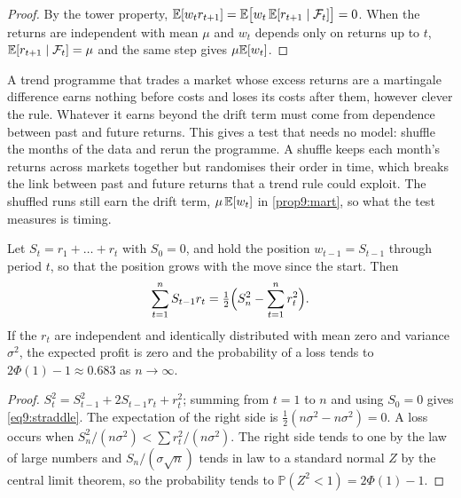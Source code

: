 \begin{chapterrefs}
\begin{proof}
By the tower property, $\mathbb{E}[w_tr_{t+1}]=\mathbb{E}\bigl[w_t\,\mathbb{E}[r_{t+1}\mid\mathcal F_t]\bigr]=0$. When the returns
are independent with mean $\mu$ and $w_t$ depends only on returns up to $t$,
$\mathbb{E}[r_{t+1}\mid\mathcal F_t]=\mu$ and the same step gives $\mu\mathbb{E}[w_t]$.
\end{proof}

A trend programme that trades a market whose excess returns are a martingale difference earns
nothing before costs and loses its costs after them, however clever the rule. Whatever it earns
beyond the drift term must come from dependence between past and future returns. This gives a test
that needs no model: shuffle the months of the data and rerun the programme. A shuffle keeps each
month's returns across markets together but randomises their order in time, which breaks the link
between past and future returns that a trend rule could exploit. The shuffled runs still earn the
drift term, $\mu\,\mathbb{E}[w_t]$ in \cref{prop9:mart}, so what the test measures is timing.

\begin{proposition}\label{prop9:straddle}
Let $S_t=r_1+\dots+r_t$ with $S_0=0$, and hold the position $w_{t-1}=S_{t-1}$ through period $t$, so that
the position grows with the move since the start. Then
\begin{equation}\label{eq9:straddle}
  \sum_{t=1}^n S_{t-1}r_t = \tfrac12\Bigl(S_n^2-\sum_{t=1}^n r_t^2\Bigr).
\end{equation}
If the $r_t$ are independent and identically distributed with mean zero and variance $\sigma^2$, the expected profit is zero and the
probability of a loss tends to $2\Phi(1)-1\approx0.683$ as $n\to\infty$.
\end{proposition}

\begin{proof}
$S_t^2=S_{t-1}^2+2S_{t-1}r_t+r_t^2$; summing from $t=1$ to $n$ and using $S_0=0$ gives \cref{eq9:straddle}.
The expectation of the right side is $\tfrac12(n\sigma^2-n\sigma^2)=0$. A loss occurs when
$S_n^2/(n\sigma^2)<\sum r_t^2/(n\sigma^2)$. The right side tends to one by the law of large numbers and
$S_n/(\sigma\sqrt n)$ tends in law to a standard normal $Z$ by the central limit theorem, so the
probability tends to $\mathbb P(Z^2<1)=2\Phi(1)-1$.
\end{proof}


\end{chapterrefs}
